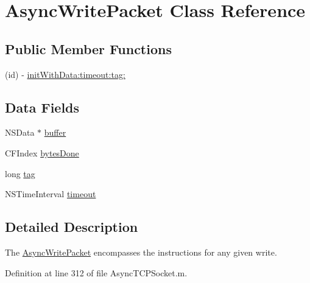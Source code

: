 \hypertarget{interface_async_write_packet}{
\section{AsyncWritePacket Class Reference}
\label{interface_async_write_packet}
}
\subsection*{Public Member Functions}
\begin{DoxyCompactItemize}
\item 
(id) -\/ \hyperlink{interface_async_write_packet_ad0525455a66fc8d8ee9d7aeef6f1d8c7}{initWithData:timeout:tag:}
\end{DoxyCompactItemize}
\subsection*{Data Fields}
\begin{DoxyCompactItemize}
\item 
NSData $\ast$ \hyperlink{interface_async_write_packet_ad22b56df684e13a8ab95555fc889b553}{buffer}
\item 
CFIndex \hyperlink{interface_async_write_packet_a804028456a90dacc02875cce444fc633}{bytesDone}
\item 
long \hyperlink{interface_async_write_packet_ae10c29173f0af40507d7e787905c7130}{tag}
\item 
NSTimeInterval \hyperlink{interface_async_write_packet_a39233eb85b4cbae04411577510e7c5e6}{timeout}
\end{DoxyCompactItemize}


\subsection{Detailed Description}
The \hyperlink{interface_async_write_packet}{AsyncWritePacket} encompasses the instructions for any given write. 

Definition at line 312 of file AsyncTCPSocket.m.



